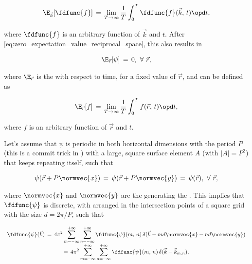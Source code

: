 \begin{equation} \label{eq:expectation_value_reciprocal_space_with_regard_to_t_definition}
\E_{\vec{k}}[\fdfunc{f}] \,=\, \lim_{T\to\infty}\frac{1}{T}\int_0^T \fdfunc{f}(\vec{k},\,t)\opd t,
\end{equation}

where $\fdfunc{f}$ is an arbitrary function of $\vec{k}$ and $t$. After  \eqref{eq:zero_expectation_value_reciprocal_space}, this also results in 

\begin{equation} \label{eq:zero_expectation_value_real_space_with_regard_to_t}
\E_{\vec{r}}[\psi] \,=\, 0,\ \forall\ \vec{r},
\end{equation}

where $\E_{\vec{r}}$ is the  with respect to time, for a fixed value of $\vec{r}$, and can be defined as

\begin{equation} \label{eq:expectation_value_real_space_with_regard_to_t_definition}
\E_{\vec{r}}[f] \,=\, \lim_{T\to\infty}\frac{1}{T}\int_0^T f(\vec{r},\,t)\opd t,
\end{equation}

where $f$ is an arbitrary function of $\vec{r}$ and $t$.

Let's assume that $\psi$ is periodic in both horizontal dimensions with the period $P$ (this is a commit trick in ) with a large, square surface element $A$ (with \mbox{$|A| = P^2$}) that keeps repeating itself, such that

\begin{equation} \label{eq:water_surface_periodicity}
\psi(\vec{r}+P\normvec{x}) \,=\, \psi(\vec{r}+P\normvec{y}) \,=\, \psi(\vec{r}),\ \forall\ \vec{r},
\end{equation}

where $\normvec{x}$ and $\normvec{y}$ are the  generating the . This implies that $\fdfunc{\psi}$ is discrete, with  arranged in the intersection points of a square grid with the size $d = 2\pi/P$, such that

\begin{equation} \label{eq:fd_eta_series}
\renewcommand*{\arraystretch}{2}
\begin{array}{c}
\displaystyle \fdfunc{\psi}(\vec{k}) \,=\, 4\pi^2\sum_{m=-\infty}^{+\infty}\sum_{n=-\infty}^{+\infty} \fdfunc{\psi}(m,\,n)\,\delta(\vec{k} - md\normvec{x} - nd\normvec{y}) \\
\displaystyle =\, 4\pi^2\sum_{m=-\infty}^{+\infty}\sum_{n=-\infty}^{+\infty} \fdfunc{\psi}(m,\,n)\,\delta(\vec{k} - \vec{k}_{m,n}),
\end{array}
\end{equation}

